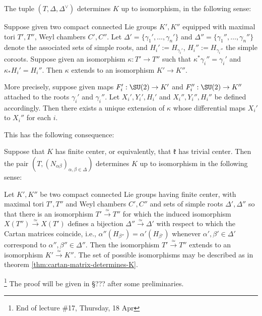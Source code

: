 \documentclass[reqno]{amsart} 
\begin{document}
\begin{theorem}\label{thm:cartan-matrix-determines-K}
  The tuple $(T, \Delta, \Delta^\vee)$ determines $K$ up to isomorphism, in the following sense:

  Suppose given two compact connected Lie groups $K', K''$ equipped with maximal tori $T', T''$, Weyl chambers $C', C''$.  Let $\Delta ' = \{\gamma_1 ', \dotsc, \gamma_n'\}$ and $\Delta '' = \{\gamma_1 '', \dotsc, \gamma_n''\}$ denote the associated sets of simple roots, and $H_i' := H_{\gamma_i'}$, $H_i'' := H_{\gamma_i''}$ the simple coroots.  Suppose given an isomorphism $\kappa : T' \rightarrow T''$ such that $\kappa^* \gamma_i'' = \gamma_i'$ and $\kappa_* H_i' = H_i''$.  Then $\kappa$ extends to an isomorphism $K' \rightarrow K''$.

  More precisely, suppose given maps $F_i' : \SU(2) \rightarrow K'$ and $F_i'' : \SU(2) \rightarrow K''$ attached to the roots $\gamma_i'$ and $\gamma_i''$.  Let $X_i', Y_i', H_i'$ and $X_i'', Y_i'', H_i''$ be defined accordingly.  Then there exists a unique extension of $\kappa$ whose differential maps $X_i'$ to $X_i''$ for each $i$.
\end{theorem}
This has the following consequence:
\begin{corollary}
  Suppose that $K$ has finite center, or equivalently, that $\mathfrak{k}$ has trivial center.  Then the pair $(T, (N_{\alpha \beta})_{\alpha,\beta \in \Delta})$ determines $K$ up to isomorphism in the following sense:

  Let $K', K''$ be two compact connected Lie groups having finite center, with maximal tori $T', T''$ and Weyl chambers $C', C''$ and sets of simple roots $\Delta ', \Delta ''$ so that there is an isomorphism $T' \xrightarrow{\simeq } T''$ for which the induced isomorphism $X(T'') \xrightarrow{\simeq } X(T')$ defines a bijection $\Delta '' \xrightarrow{\simeq } \Delta '$ with respect to which the Cartan matrices coincide, i.e., $\alpha ''(H_{\beta ''}) = \alpha '(H_{\beta '})$ whenever $\alpha ', \beta ' \in \Delta '$ correspond to $\alpha '', \beta '' \in \Delta ''$.  Then the isomorphism $T' \xrightarrow{\simeq } T''$ extends to an isomorphism $K' \xrightarrow{\simeq } K''$.  The set of possible isomorphisms may be described as in theorem \ref{thm:cartan-matrix-determines-K}.
\end{corollary}


\footnote{End of lecture \#17, Thursday, 18 Apr} The proof will be given in \S??? after some preliminaries.
\end{document}

